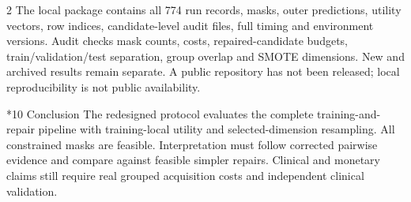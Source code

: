 \documentclass[10pt,a4paper]{article}
\makeatletter
\renewcommand{\section}{\@startsection{section}{1}{0pt}{5pt}{2pt}{\normalfont\normalsize\bfseries}}
\newcommand{\sect}[1]{\section*{#1}}
\makeatother
\begin{document}
\begin{multicols}{2}
The local package contains all 774 run records, masks, outer predictions, utility vectors, row indices, candidate-level audit files, full timing and environment versions. Audit checks mask counts, costs, repaired-candidate budgets, train/validation/test separation, group overlap and SMOTE dimensions. New and archived results remain separate. A public repository has not been released; local reproducibility is not public availability.

\sect{10  Conclusion}
The redesigned protocol evaluates the complete training-and-repair pipeline with training-local utility and selected-dimension resampling. All constrained masks are feasible. Interpretation must follow corrected pairwise evidence and compare against feasible simpler repairs. Clinical and monetary claims still require real grouped acquisition costs and independent clinical validation.


\end{multicols}
\end{document}
